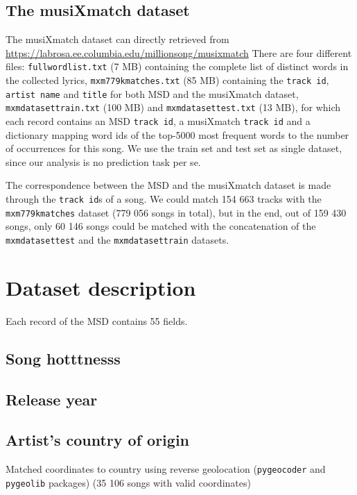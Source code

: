 \documentclass[11pt]{article}
\renewcommand\_{\textunderscore\allowbreak}
\begin{document}
\subsection{The musiXmatch dataset}
The musiXmatch dataset can directly retrieved from \url{https://labrosa.ee.columbia.edu/millionsong/musixmatch}
There are four different files: 
\texttt{full\_word\_list.txt} (7 MB) containing the complete list of distinct words in the collected lyrics, \texttt{mxm\_779k\_matches.txt} (85 MB) containing the \texttt{track id}, \texttt{artist name} and \texttt{title} for both MSD and the musiXmatch dataset, \texttt{mxm\_dataset\_train.txt} (100 MB) and \texttt{mxm\_dataset\_test.txt} (13 MB), for which each record contains an MSD \texttt{track id}, a musiXmatch \texttt{track id} and a dictionary mapping word ids of the top-5000 most frequent words to the number of occurrences for this song.
We use the train set and test set as single dataset, since our analysis is no prediction task per se.

The correspondence between the MSD and the musiXmatch dataset is made through the \texttt{track id}s of a song.
We could match 154 663 tracks with the \texttt{mxm\_779k\_matches} dataset (779 056 songs in total), but in the end, out of 159 430 songs, only 60 146 songs could be matched with the concatenation of the \texttt{mxm\_dataset\_test} and the \texttt{mxm\_dataset\_train} datasets.

\section{Dataset description}

Each record of the MSD contains 55 fields. 

\subsection{Song hotttnesss}

\subsection{Release year}

\subsection{Artist's country of origin}
Matched coordinates to country using reverse geolocation (\texttt{pygeocoder} and \texttt{pygeolib} packages) (35 106 songs with valid coordinates)
\end{document}
